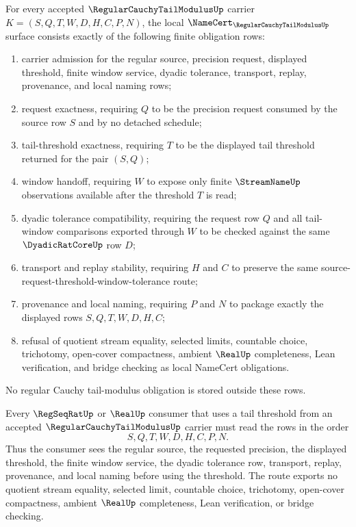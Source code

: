 \begin{theorem}
\label{thm:regular-cauchy-tail-modulus-namecert-obligations}
For every accepted $\RegularCauchyTailModulusUp$ carrier $K=(S,Q,T,W,D,H,C,P,N)$, the local $\NameCert_{\RegularCauchyTailModulusUp}$ surface consists exactly of the following finite obligation rows:
\begin{enumerate}
\item carrier admission for the regular source, precision request, displayed threshold, finite window service, dyadic tolerance, transport, replay, provenance, and local naming rows;
\item request exactness, requiring $Q$ to be the precision request consumed by the source row $S$ and by no detached schedule;
\item tail-threshold exactness, requiring $T$ to be the displayed tail threshold returned for the pair $(S,Q)$;
\item window handoff, requiring $W$ to expose only finite $\StreamNameUp$ observations available after the threshold $T$ is read;
\item dyadic tolerance compatibility, requiring the request row $Q$ and all tail-window comparisons exported through $W$ to be checked against the same $\DyadicRatCoreUp$ row $D$;
\item transport and replay stability, requiring $H$ and $C$ to preserve the same source-request-threshold-window-tolerance route;
\item provenance and local naming, requiring $P$ and $N$ to package exactly the displayed rows $S,Q,T,W,D,H,C$;
\item refusal of quotient stream equality, selected limits, countable choice, trichotomy, open-cover compactness, ambient $\RealUp$ completeness, Lean verification, and bridge checking as local NameCert obligations.
\end{enumerate}
No regular Cauchy tail-modulus obligation is stored outside these rows.
\end{theorem}

\begin{theorem}
\label{thm:regular-cauchy-tail-modulus-window-handoff}
Every $\RegSeqRatUp$ or $\RealUp$ consumer that uses a tail threshold from an accepted $\RegularCauchyTailModulusUp$ carrier must read the rows in the order
$$
S,Q,T,W,D,H,C,P,N .
$$
Thus the consumer sees the regular source, the requested precision, the displayed threshold, the finite window service, the dyadic tolerance row, transport, replay, provenance, and local naming before using the threshold. The route exports no quotient stream equality, selected limit, countable choice, trichotomy, open-cover compactness, ambient $\RealUp$ completeness, Lean verification, or bridge checking.
\end{theorem}

